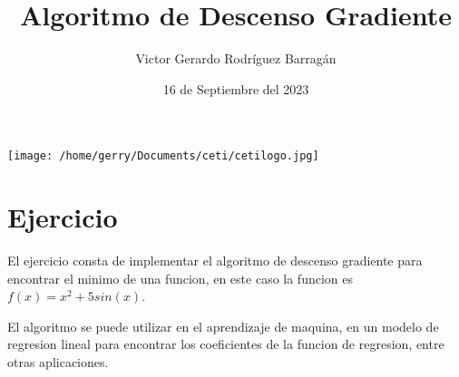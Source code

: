 \documentclass{article}
\title{Algoritmo de Descenso Gradiente}
\author{Victor Gerardo Rodríguez Barragán}
\date{16 de Septiembre del 2023}
\begin{document}
\maketitle
\begin{center}
    \texttt{[image: /home/gerry/Documents/ceti/cetilogo.jpg]}
\end{center}

\newpage
\justify
\section*{Ejercicio}
El ejercicio consta de implementar el algoritmo de descenso gradiente para encontrar el minimo
de una funcion, en este caso la funcion es $f(x) = x^2 + 5sin(x)$.

El algoritmo se puede utilizar en el aprendizaje de maquina, en un modelo de regresion lineal
para encontrar los coeficientes de la funcion de regresion, entre otras aplicaciones.
\end{document}
